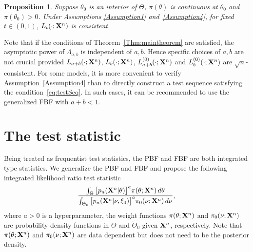 \documentclass[11pt]{article}
\theoremstyle{plain}
\newtheorem{proposition}{\quad\quad Proposition}
\theoremstyle{definition}
\theoremstyle{remark}
\begin{document}
\begin{proposition}\label{Theoremless1}
    Suppose $\theta_0$ is an interior of $\Theta$, $\pi(\theta)$ is continuous at $\theta_0$ and $\pi(\theta_0)>0$.
    Under Assumptions \ref{Assumption1} and~\ref{Assumption4}, for fixed $t\in(0,1)$, $L_t(\cdot;\mathbf{X}^{n})$ is consistent.
\end{proposition}
Note that if the conditions of Theorem~\ref{Thm:maintheorem} are satisfied, the asymptotic power of $\Lambda_{a,b}$ is independent of $a,b$.
Hence specific choices of $a,b$ are not crucial provided $L_{a+b}(\cdot;\mathbf{X}^{n})$, $L_b(\cdot;\mathbf{X}^{n})$, $L^{(0)}_{a+b}(\cdot;\mathbf{X}^{n})$ and $L^{(0)}_b(\cdot;\mathbf{X}^{n})$ are $\sqrt{n}$-consistent.
For some models, it is more convenient to verify Assumption~\ref{Assumption4} than to directly construct a test sequence satisfying the condition~\eqref{eq:testSeq}.
In such cases, it can be recommended to use the generalized FBF with $a+b< 1$.




\section{The test statistic}


 Being treated as frequentist test statistics, the PBF and FBF are both integrated type statistics.
 We generalize the PBF and FBF and propose the following integrated likelihood ratio test statistic
\begin{equation*}
    \frac{\int_{\Theta} \big[p_n(\mathbf{X}^{n}|\theta)\big]^{a}\pi(\theta;\mathbf{X}^{n})\,d\theta}{\int_{\tilde{\Theta}_0} \big[p_n(\mathbf{X}^{n}|\nu,\xi_0)\big]^{a}\pi_0(\nu;\mathbf{X}^{n})\,d\nu},
\end{equation*}
where $a>0$ is a hyperparameter,
the weight functions $\pi(\theta;\mathbf{X}^{n})$ and $\pi_0(\nu;\mathbf{X}^{n})$ are probability density functions in $\Theta$ and $\tilde{\Theta}_0$ given $\mathbf{X}^{n}$, respectively.
Note that $\pi(\theta;\mathbf{X}^{n})$ and $\pi_0(\nu;\mathbf{X}^{n})$ are data dependent but does not need to be the posterior density.
\end{document}
